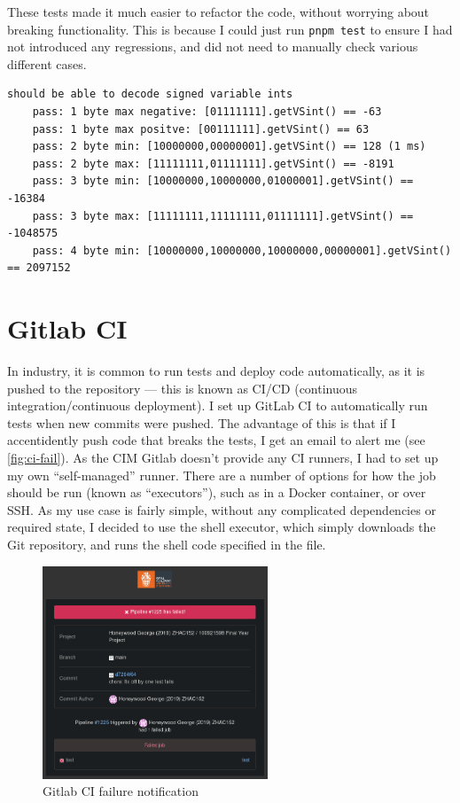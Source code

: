 \documentclass[hyphens]{final_report}
\begin{document}
These tests made it much easier to refactor the code, without worrying about breaking functionality. This is because I could just run \texttt{pnpm test} to ensure I had not introduced any regressions, and did not need to manually check various different cases.

\begin{lstlisting}[caption=Output from the \texttt{.getVSint()} test suite, numbers=none, label=lst:vint-test-output]
should be able to decode signed variable ints
    pass: 1 byte max negative: [01111111].getVSint() == -63
    pass: 1 byte max positve: [00111111].getVSint() == 63
    pass: 2 byte min: [10000000,00000001].getVSint() == 128 (1 ms)
    pass: 2 byte max: [11111111,01111111].getVSint() == -8191
    pass: 3 byte min: [10000000,10000000,01000001].getVSint() == -16384
    pass: 3 byte max: [11111111,11111111,01111111].getVSint() == -1048575
    pass: 4 byte min: [10000000,10000000,10000000,00000001].getVSint() == 2097152
\end{lstlisting}

\section{Gitlab CI}

In industry, it is common to run tests and deploy code automatically, as it is pushed to the repository --- this is known as CI/CD (continuous integration/continuous deployment). I set up GitLab CI to automatically run tests when new commits were pushed. The advantage of this is that if I accentidently push code that breaks the tests, I get an email to alert me (see \autoref{fig:ci-fail}). As the CIM Gitlab doesn't provide any CI runners, I had to set up my own ``self-managed'' runner. There are a number of options for how the job should be run (known as ``executors''), such as in a Docker container, or over SSH\@. As my use case is fairly simple, without any complicated dependencies or required state, I decided to use the shell executor, which simply downloads the Git repository, and runs the shell code specified in the  file.

\begin{figure}[ht]
    \centering
    \includegraphics[width=0.6\textwidth]{images/gitlab-ci-failure.png}
    \caption{Gitlab CI failure notification}\label{fig:ci-fail}
\end{figure}
\end{document}
